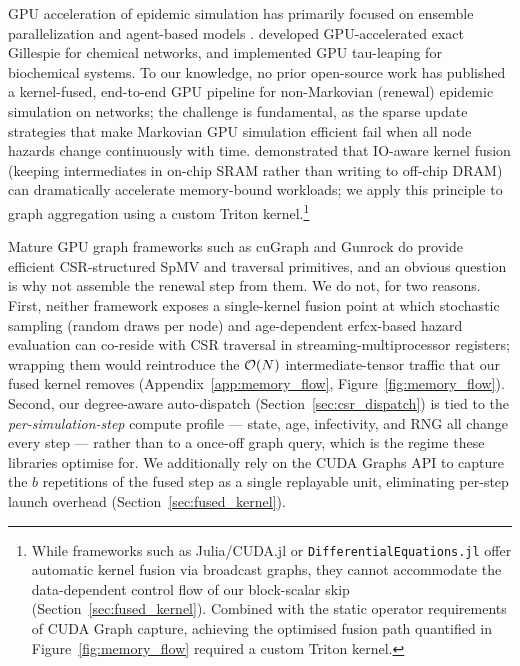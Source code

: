 GPU acceleration of epidemic simulation has primarily focused on ensemble parallelization \citep{perumalla2006discrete, zou2013epidemic} and agent-based models \citep{bisset2009parallel}. \citet{komarov2012accelerating} developed GPU-accelerated exact Gillespie for chemical networks, and \citet{nobile2014cutauleaping} implemented GPU tau-leaping for biochemical systems. To our knowledge, no prior open-source work has published a kernel-fused, end-to-end GPU pipeline for non-Markovian (renewal) epidemic simulation on networks; the challenge is fundamental, as the sparse update strategies that make Markovian GPU simulation efficient fail when all node hazards change continuously with time. \citet{dao2022flashattention} demonstrated that IO-aware kernel fusion (keeping intermediates in on-chip SRAM rather than writing to off-chip DRAM) can dramatically accelerate memory-bound workloads; we apply this principle to graph aggregation using a custom Triton kernel.\footnote{While frameworks such as Julia/CUDA.jl or \texttt{DifferentialEquations.jl} offer automatic kernel fusion via broadcast graphs, they cannot accommodate the data-dependent control flow of our block-scalar skip (Section~\ref{sec:fused_kernel}). Combined with the static operator requirements of CUDA Graph capture, achieving the optimised fusion path quantified in Figure~\ref{fig:memory_flow} required a custom Triton kernel.}

Mature GPU graph frameworks such as cuGraph \citep{nvidia2019cugraph} and Gunrock \citep{wang2016gunrock} do provide efficient CSR-structured SpMV and traversal primitives, and an obvious question is why not assemble the renewal step from them. We do not, for two reasons. First, neither framework exposes a single-kernel fusion point at which stochastic sampling (random draws per node) and age-dependent $\mathrm{erfcx}$-based hazard evaluation can co-reside with CSR traversal in streaming-multiprocessor registers; wrapping them would reintroduce the $\mathcal{O}(N)$ intermediate-tensor traffic that our fused kernel removes (Appendix~\ref{app:memory_flow}, Figure~\ref{fig:memory_flow}). Second, our degree-aware auto-dispatch (Section~\ref{sec:csr_dispatch}) is tied to the \emph{per-simulation-step} compute profile --- state, age, infectivity, and RNG all change every step --- rather than to a once-off graph query, which is the regime these libraries optimise for. We additionally rely on the CUDA Graphs API \citep{nvidia2024cudagraphs} to capture the $b$ repetitions of the fused step as a single replayable unit, eliminating per-step launch overhead (Section~\ref{sec:fused_kernel}).

